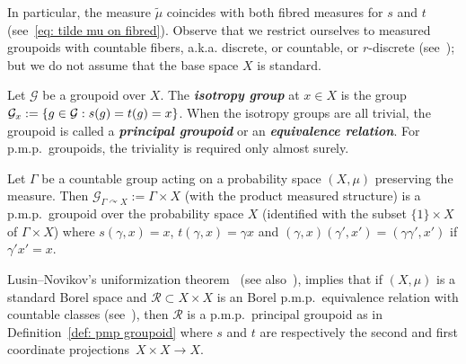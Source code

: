 \documentclass[AHL,Unicode,longabstracts,published]{cedram}
\newcommand{\defin}[1]{\textbf{\emph{#1}}}
\newcommand{\acting}{\curvearrowright}
\newcommand{\RR}{\mathcal{R}}
\newcommand{\cg}{\mathcal{G}}
\newcommand{\pmp}{p.m.p.\ }
\begin{document}
In particular, the measure $\widetilde{\mu}$ coincides with both fibred measures for $s$ and $t$ (see~\eqref{eq: tilde mu on fibred}). Observe that we restrict ourselves to measured groupoids with countable fibers, a.k.a. discrete, or countable, or $r$-discrete (see~\cite{2000-Anantharaman-Renault-Amen-gpoids}); but we do not assume that the base space $X$ is standard.



Let $\cg$ be a groupoid over $X$. The
\defin{isotropy group} at $x\in X$ is the group $\cg_x \linebreak:=\{g\in\cg: s(g)=t(g)=x\}$. When the isotropy groups are all trivial, the groupoid is called a
\defin{principal groupoid} or an
\defin{equivalence relation}. For \pmp groupoids, the triviality is required only almost surely.

\begin{exam}\label{ex: groupoid from pmp action}
Let $\Gamma$ be a countable group acting on a probability space $(X,\mu)$ preserving the measure. Then $\cg_{\Gamma\acting X}:=\Gamma \times X$ (with the product measured structure) is a \pmp groupoid over the probability space $X$ (identified with the subset $\{1\}\times X$ of $\Gamma \times X$) where $s(\gamma,x)=x$, $t(\gamma,x)=\gamma x$ and $(\gamma,x)(\gamma',x')=(\gamma\gamma',x')$ if $\gamma'x'=x$.
\end{exam}


\begin{exam}
Lusin--Novikov's uniformization theorem~\cite{Lusin-Novikoff-1935} (see also~\cite[Theorem~18.10]{Kechris-class-descr-th-1995}), implies that if $(X,\mu)$ is a standard Borel space and $\RR\subset X \times X$ is an Borel \pmp equivalence relation with countable classes (see~\cite{FeldmanMoore-1977}), then $\RR$ is a \pmp principal groupoid as in Definition~\ref{def: pmp groupoid} where $s$ and $t$ are respectively the second and first coordinate projections~$X \times X \to X$.
\end{exam}
\end{document}
